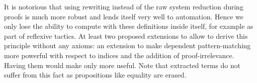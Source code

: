 It is notorious that using rewriting instead of the raw system reduction
during proofs is much more robust and lends itself very well to
automation. Hence we only lose the ability to compute with these
definitions inside \Coq itself, for example as part of reflexive
tactics. At least two proposed extensions to \Coq allow to derive this
principle without any axioms: an extension to make dependent
pattern-matching more powerful with respect to indices \cite{conf/types/BarrasCGHS08} and 
the addition of proof-irrelevance. Having them would make \Equations
only more useful. Note that extracted terms do not suffer from this fact
as propositions like equality are erased.



